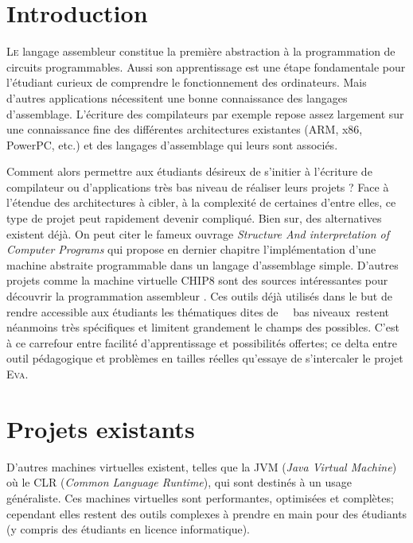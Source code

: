 \documentclass[11pt]{article}
\makeatletter
\providecommand{\og}{\leavevmode\flqq~}%
\providecommand{\fg}{\ifdim\lastskip>\z@\unskip\fi~\frqq}%
\newcommand{\noun}[1]{\textsc{#1}}
\makeatother
\begin{document}
\hspace{0pt}
\vfill

\section{Introduction}

\lettrine[lines=3,slope=.3em]%
{L}{e} langage assembleur constitue la première abstraction à la programmation
de circuits programmables. Aussi son apprentissage est une étape fondamentale pour l'étudiant curieux de comprendre le fonctionnement des ordinateurs. Mais d'autres applications nécessitent une bonne connaissance des langages d'assemblage. L'écriture des compilateurs par exemple repose assez largement sur une connaissance fine des différentes architectures existantes (ARM, x86, PowerPC, etc.) et des langages d'assemblage qui leurs sont associés.

Comment alors permettre aux étudiants désireux de s'initier à l'écriture de compilateur ou d'applications très bas niveau de réaliser leurs projets ? Face à l'étendue des architectures à cibler, à la complexité de certaines d’entre elles, ce type de projet peut rapidement devenir compliqué. Bien sur, des alternatives existent déjà. On peut citer le fameux ouvrage \textit{Structure And interpretation of Computer Programs} \cite{SICP} qui propose en dernier chapitre l'implémentation d'une machine abstraite programmable dans un langage d'assemblage simple. D'autres projets comme la machine virtuelle CHIP8 sont des sources intéressantes pour découvrir la programmation assembleur \cite{CHIP8}. Ces outils déjà utilisés dans le but de rendre accessible aux étudiants les thématiques dites de \og~bas niveaux\fg restent néanmoins très spécifiques et limitent grandement le champs des possibles. C'est à ce carrefour entre facilité d'apprentissage et possibilités offertes; ce delta entre outil pédagogique et problèmes en tailles réelles qu'essaye de s'intercaler le projet \noun{Eva}. \\

\section{Projets existants}

D'autres machines virtuelles existent, telles que la JVM (\emph{Java Virtual Machine}) où le CLR (\emph{Common Language Runtime}), qui sont destinés à un usage généraliste. Ces machines virtuelles sont performantes, optimisées et complètes; cependant elles restent des outils complexes à prendre en main pour des étudiants (y compris des étudiants en licence informatique).\\
\end{document}
